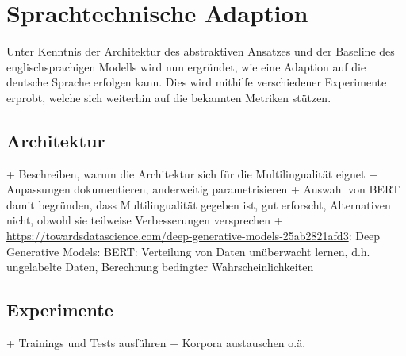 \chapter{Sprachtechnische Adaption}
\thispagestyle{fancy}
\label{chap:Sprachtechnische Adaption}

\noindent
Unter Kenntnis der Architektur des abstraktiven Ansatzes und der Baseline des englischsprachigen Modells wird nun ergründet, wie eine Adaption auf die deutsche Sprache erfolgen kann. Dies wird mithilfe verschiedener Experimente erprobt, welche sich weiterhin auf die bekannten Metriken stützen.\\


\section{Architektur}
\noindent
+ Beschreiben, warum die Architektur sich für die Multilingualität eignet
+ Anpassungen dokumentieren, anderweitig parametrisieren
+ Auswahl von BERT damit begründen, dass Multilingualität gegeben ist, gut erforscht, Alternativen nicht, obwohl sie teilweise Verbesserungen versprechen
+ \url{https://towardsdatascience.com/deep-generative-models-25ab2821afd3}: Deep Generative Models: BERT: Verteilung von Daten unüberwacht lernen, d.h. ungelabelte Daten, Berechnung bedingter Wahrscheinlichkeiten\\


\section{Experimente}
\noindent
+ Trainings und Tests ausführen
+ Korpora austauschen o.ä.\\
